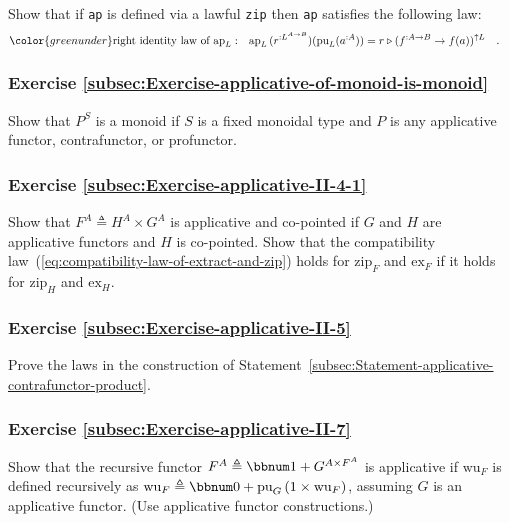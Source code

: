 Show that if \lstinline!ap! is defined via a lawful \lstinline!zip!
then \lstinline!ap! satisfies the following law:
\begin{align*}
{\color{greenunder}\text{right identity law of }\text{ap}_{L}:}\quad & \text{ap}_{L}\,(r^{:L^{A\rightarrow B}})(\text{pu}_{L}(a^{:A}))=r\triangleright(f^{:A\rightarrow B}\rightarrow f(a))^{\uparrow L}\quad.
\end{align*}


\subsubsection{Exercise \label{subsec:Exercise-applicative-of-monoid-is-monoid}\ref{subsec:Exercise-applicative-of-monoid-is-monoid}}

Show that $P^{S}$ is a monoid if $S$ is a fixed monoidal type and
$P$ is any applicative functor, contrafunctor, or profunctor.

\subsubsection{Exercise \label{subsec:Exercise-applicative-II-4-1}\ref{subsec:Exercise-applicative-II-4-1}}

Show that $F^{A}\triangleq H^{A}\times G^{A}$ is applicative and
co-pointed if $G$ and $H$ are applicative functors and $H$ is co-pointed.
Show that the compatibility law~(\ref{eq:compatibility-law-of-extract-and-zip})
holds for $\text{zip}_{F}$ and $\text{ex}_{F}$ if it holds for $\text{zip}_{H}$
and $\text{ex}_{H}$.

\subsubsection{Exercise \label{subsec:Exercise-applicative-II-5}\ref{subsec:Exercise-applicative-II-5}}

Prove the laws in the construction of Statement~\ref{subsec:Statement-applicative-contrafunctor-product}.

\subsubsection{Exercise \label{subsec:Exercise-applicative-II-7}\ref{subsec:Exercise-applicative-II-7}}

Show that the recursive functor $F^{A}\triangleq\bbnum 1+G^{A\times F^{A}}$
is applicative if $\text{wu}_{F}$ is defined recursively as $\text{wu}_{F}\triangleq\bbnum 0+\text{pu}_{G}\left(1\times\text{wu}_{F}\right)$,
assuming $G$ is an applicative functor. (Use applicative functor
constructions.)

